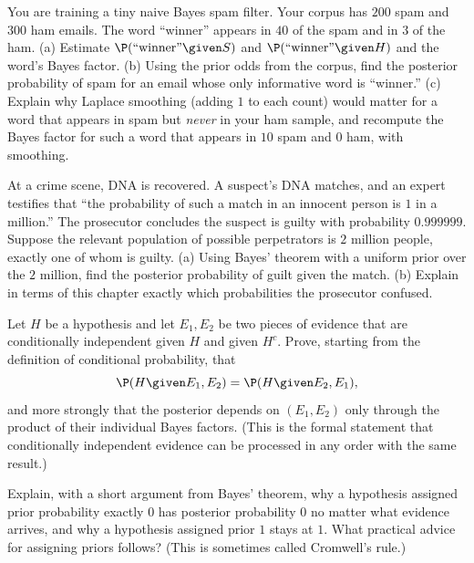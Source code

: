 \begin{exercise}
You are training a tiny naive Bayes spam filter. Your corpus has $200$ spam and $300$ ham
emails. The word ``winner'' appears in $40$ of the spam and in $3$ of the ham.
(a) Estimate $\P(\text{``winner''}\given S)$ and $\P(\text{``winner''}\given H)$ and the
word's Bayes factor. (b) Using the prior odds from the corpus, find the posterior
probability of spam for an email whose only informative word is ``winner.'' (c) Explain
why Laplace smoothing (adding $1$ to each count) would matter for a word that appears in
spam but \emph{never} in your ham sample, and recompute the Bayes factor for such a word
that appears in $10$ spam and $0$ ham, with smoothing.
\end{exercise}

\begin{exercise}
At a crime scene, DNA is recovered. A suspect's DNA matches, and an expert testifies that
``the probability of such a match in an innocent person is $1$ in a million.'' The
prosecutor concludes the suspect is guilty with probability $0.999999$. Suppose the
relevant population of possible perpetrators is $2$ million people, exactly one of whom is
guilty. (a) Using Bayes' theorem with a uniform prior over the $2$ million, find the
posterior probability of guilt given the match. (b) Explain in terms of this chapter
exactly which probabilities the prosecutor confused.
\end{exercise}

\begin{exercise}
Let $H$ be a hypothesis and let $E_1, E_2$ be two pieces of evidence that are
conditionally independent given $H$ and given $H^c$. Prove, starting from the definition of
conditional probability, that
\[
  \P(H\given E_1, E_2) = \P(H \given E_2, E_1),
\]
and more strongly that the posterior depends on $(E_1,E_2)$ only through the product of
their individual Bayes factors. (This is the formal statement that conditionally
independent evidence can be processed in any order with the same result.)
\end{exercise}

\begin{exercise}
Explain, with a short argument from Bayes' theorem, why a hypothesis assigned prior
probability exactly $0$ has posterior probability $0$ no matter what evidence arrives, and
why a hypothesis assigned prior $1$ stays at $1$. What practical advice for assigning
priors follows? (This is sometimes called Cromwell's rule.)
\end{exercise}

